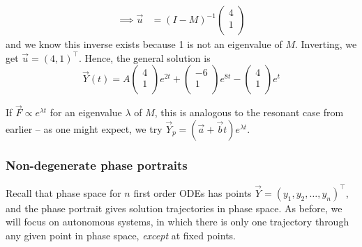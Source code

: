 \documentclass{../../template/note}
\begin{document}
\begin{example}
\begin{align*}
            \implies \vec u &= (I - M)^{-1} \begin{pmatrix}
             4 \\
             1 \\
            \end{pmatrix}
        \end{align*}
        and we know this inverse exists because 1 is not an eigenvalue of \(M\). Inverting, we get \(\vec u = (4, 1)^\intercal\). Hence, the general solution is
        \[
            \vec Y(t) = A \begin{pmatrix}
             4 \\
             1 \\
            \end{pmatrix} e^{2t} + \begin{pmatrix}
             -6 \\
             1 \\
            \end{pmatrix} e^{8t} - \begin{pmatrix}
             4 \\
             1 \\
            \end{pmatrix} e^t
        \]
    \end{example}
    
    \begin{remark}
        If \(\vec F \propto e^{\lambda t}\) for an eigenvalue \(\lambda\) of \(M\), this is analogous to the resonant case from earlier -- as one might expect, we try \(\vec Y_p = (\vec a + \vec b t)e^{\lambda t}\).
    \end{remark}
    
    \subsubsection{Non-degenerate phase portraits}

    Recall that phase space for \(n\) first order ODEs has points \(\vec Y = (y_1, y_2, \dots, y_n)^\intercal\), and the phase portrait gives solution trajectories in phase space. As before, we will focus on autonomous systems, in which there is only one trajectory through any given point in phase space, \emph{except} at fixed points.
\end{document}
